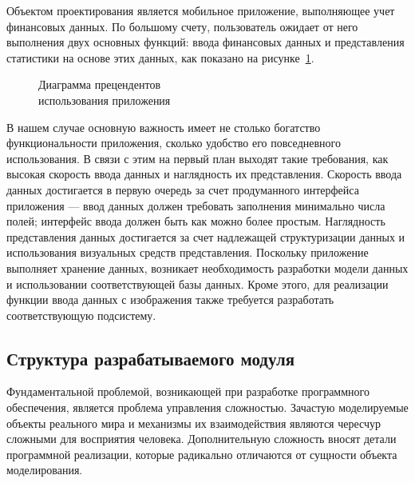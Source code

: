 Объектом проектирования является мобильное приложение,
выполняющее учет финансовых данных. По большому счету, пользователь
ожидает от него выполнения двух основных функций:
ввода финансовых данных и представления статистики на основе этих данных,
как показано на рисунке~\ref{fig:design_use_cases}.

\begin{figure}[h!]
  \centering
  \caption{Диаграмма прецендентов \\ использования приложения}
  \label{fig:design_use_cases}
\end{figure}

В нашем случае основную важность имеет не столько богатство
функциональности приложения, сколько удобство его повседневного использования.
В связи с этим на первый план выходят такие требования, как
высокая скорость ввода данных и наглядность их представления.
Скорость ввода данных достигается в первую очередь за счет
продуманного интерфейса приложения ---
ввод данных должен требовать заполнения минимально числа полей;
интерфейс ввода должен быть как можно более простым.
Наглядность представления данных достигается за счет надлежащей
структуризации данных и использования визуальных средств представления.
Поскольку приложение выполняет хранение данных, возникает необходимость
разработки модели данных и использовании соответствующей базы данных.
Кроме этого, для реализации функции ввода данных с изображения
также требуется разработать соответствующую подсистему.

\subsection{Структура разрабатываемого модуля}
\label{subsec:design_structure}

Фундаментальной проблемой, возникающей при разработке программного обеспечения,
является проблема управления сложностью. Зачастую моделируемые объекты реального
мира и механизмы их взаимодействия являются чересчур сложными для восприятия человека.
Дополнительную сложность вносят детали программной
реализации, которые радикально отличаются от сущности объекта моделирования.

